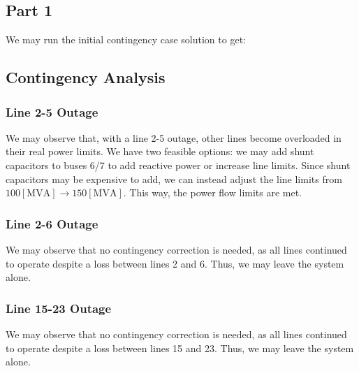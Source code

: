 \documentclass[
	letterpaper, %
	10pt, %
]{CSUniSchoolLabReport}
\begin{document}
\subsection{Part 1}

We may run the initial contingency case solution to get:


\subsection{Contingency Analysis}

\subsubsection{Line 2-5 Outage}


We may observe that, with a line 2-5 outage, other lines become overloaded in their real power limits. We have two feasible options: we may add shunt capacitors to buses 6/7 to add reactive power or increase line limits. Since shunt capacitors may be expensive to add, we can instead adjust the line limits from $100[\si{\mega\volt\ampere}]\to150[\si{\mega\volt\ampere}]$. This way, the power flow limits are met.

\subsubsection{Line 2-6 Outage}


We may observe that no contingency correction is needed, as all lines continued to operate despite a loss between lines 2 and 6. Thus, we may leave the system alone.

\subsubsection{Line 15-23 Outage}


We may observe that no contingency correction is needed, as all lines continued to operate despite a loss between lines 15 and 23. Thus, we may leave the system alone.
\end{document}
